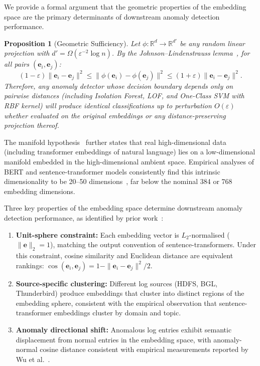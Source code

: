 \documentclass[conference]{IEEEtran}
\newtheorem{proposition}{Proposition}
\begin{document}
We provide a formal argument that the geometric properties of the embedding
space are the primary determinants of downstream anomaly detection
performance.

\begin{proposition}[Geometric Sufficiency]
Let $\phi: \mathbb{R}^d \to \mathbb{R}^{d'}$ be any random linear projection
with $d' = \Omega(\varepsilon^{-2} \log n)$.  By the Johnson--Lindenstrauss
lemma~\cite{johnson1984}, for all pairs $(\mathbf{e}_i, \mathbf{e}_j)$:
\begin{equation}
(1-\varepsilon)\|\mathbf{e}_i - \mathbf{e}_j\|^2 \le
\|\phi(\mathbf{e}_i) - \phi(\mathbf{e}_j)\|^2 \le
(1+\varepsilon)\|\mathbf{e}_i - \mathbf{e}_j\|^2.
\label{eq:jl_lemma}
\end{equation}
Therefore, any anomaly detector whose decision boundary depends only on
pairwise distances (including Isolation Forest, LOF, and One-Class SVM with
RBF kernel) will produce identical classifications up to perturbation
$O(\varepsilon)$ whether evaluated on the original embeddings or any
distance-preserving projection thereof.
\end{proposition}

The manifold hypothesis~\cite{bengio2013} further states that real
high-dimensional data (including transformer embeddings of natural language)
lies on a low-dimensional manifold embedded in the high-dimensional ambient
space.  Empirical analyses of BERT and sentence-transformer models
consistently find this intrinsic dimensionality to be 20--50
dimensions~\cite{wu2025, bengio2013}, far below the nominal 384 or 768
embedding dimensions.

Three key properties of the embedding space determine downstream anomaly
detection performance, as identified by prior
work~\cite{wu2025, yan2024, pang2021}:
\begin{enumerate}
    \item \textbf{Unit-sphere constraint:} Each embedding vector is
          $L_2$-normalised ($\|\mathbf{e}\|_2 = 1$), matching the output
          convention of sentence-transformers.  Under this constraint, cosine
          similarity and Euclidean distance are equivalent rankings:
          $\cos(\mathbf{e}_i, \mathbf{e}_j) = 1 - \|\mathbf{e}_i -
          \mathbf{e}_j\|^2/2$.
    \item \textbf{Source-specific clustering:} Different log sources (HDFS,
          BGL, Thunderbird) produce embeddings that cluster into distinct
          regions of the embedding sphere, consistent with the empirical
          observation that sentence-transformer embeddings cluster by domain
          and topic.
    \item \textbf{Anomaly directional shift:} Anomalous log entries exhibit
          semantic displacement from normal entries in the embedding space,
          with anomaly-normal cosine distance consistent with empirical
          measurements reported by Wu et al.~\cite{wu2025}.
\end{enumerate}
\end{document}
